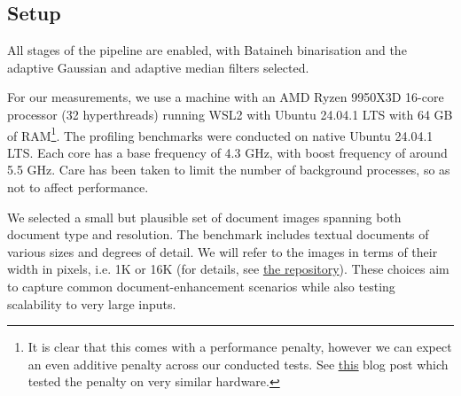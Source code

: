 \documentclass[sigconf]{acmart}
\begin{document}
\subsection{Setup}
\label{sec:experimental-setup}

All stages of the pipeline are enabled, with Bataineh binarisation and the adaptive Gaussian and adaptive median filters selected.

For our measurements, we use a machine with an AMD Ryzen 9950X3D 16-core processor (32 hyperthreads) running WSL2 with Ubuntu 24.04.1 LTS with 64 GB of RAM\footnote{It is clear that this comes with a performance penalty, however we can expect an even additive penalty across our conducted tests. See \underline{\href{https://www.phoronix.com/review/windows-11-wsl2-2025/2}{this}} blog post which tested the penalty on very similar hardware.}. The profiling benchmarks were conducted on native Ubuntu 24.04.1 LTS. Each core has a base frequency of 4.3 GHz, with boost frequency of around 5.5 GHz. Care has been taken to limit the number of background processes, so as not to affect performance.

We selected a small but plausible set of document images spanning both document type and resolution. The benchmark includes textual documents of various sizes and degrees of detail. We will refer to the images in terms of their width in pixels, i.e. 1K or 16K (for details, see \href{https://github.com/MherMnatsakanyan03/image_text_enhancer/tree/main/resources/test_images}{the repository}). %
These choices aim to capture common document-enhancement scenarios while also testing scalability to very large inputs.
\end{document}
